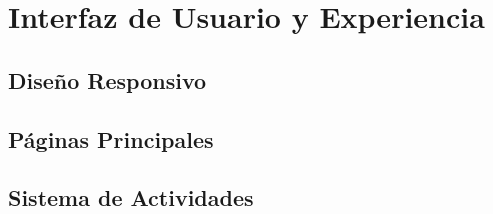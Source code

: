 \chapter{Interfaz de Usuario y Experiencia}
\section{Diseño Responsivo}
\section{Páginas Principales}
\section{Sistema de Actividades}
